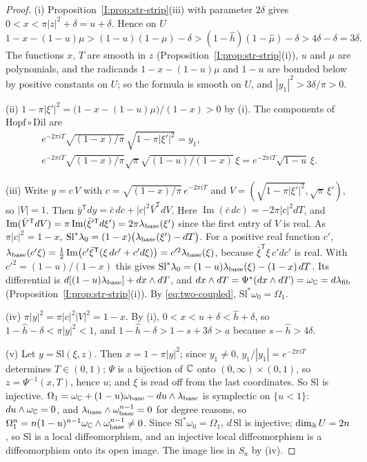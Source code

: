 \begin{proof}
(i) Proposition~\ref{I:prop:str-strip}(iii) with parameter $2\delta$ gives $0<x<\pi|z|^2+\delta=u+\delta$. Hence on $U$
\[
 1-x-(1-u)\mu>(1-u)(1-\mu)-\delta>(1-\hat h)(1-\hat\mu)-\delta>4\delta-\delta=3\delta .
\]
The functions $x$, $T$ are smooth in $z$ (Proposition~\ref{I:prop:str-strip}(i)), $u$ and $\mu$ are polynomials, and the
radicands $1-x-(1-u)\mu$ and $1-u$ are bounded below by positive constants on $U$; so the formula is smooth on $U$,
and $|y_1|^2>3\delta/\pi>0$.

(ii) $1-\pi|\xi'|^2=\bigl(1-x-(1-u)\mu\bigr)/(1-x)>0$ by (i). The components of $\mathrm{Hopf}\circ\mathrm{Dil}$ are
\begin{gather*}
 e^{-2\pi iT}\sqrt{(1-x)/\pi}\,\sqrt{1-\pi|\xi'|^2}=y_1,\\
 e^{-2\pi iT}\sqrt{(1-x)/\pi}\sqrt\pi\sqrt{(1-u)/(1-x)}\,\xi=e^{-2\pi iT}\sqrt{1-u}\,\xi.
\end{gather*}

(iii) Write $y=c\,V$ with $c=\sqrt{(1-x)/\pi}\,e^{-2\pi iT}$ and $V=(\sqrt{1-\pi|\xi'|^2},\sqrt\pi\,\xi')$, so $|V|=1$. Then
$\bar y^{\mathsf T}dy=\bar c\,dc+|c|^2\bar V^{\mathsf T}dV$. Here $\operatorname{Im}(\bar c\,dc)=-2\pi|c|^2dT$, and
$\operatorname{Im}(\bar V^{\mathsf T}dV)=\pi\operatorname{Im}(\bar\xi'^{\mathsf T}d\xi')=2\pi\lambda_{\rm base}(\xi')$ since the first entry of $V$ is
real. As $\pi|c|^2=1-x$, $\mathrm{Sl}^*\lambda_0=(1-x)\bigl(\lambda_{\rm base}(\xi')-dT\bigr)$. For a positive real function $c'$, $\lambda_{\rm base}(c'\xi)=\frac12\operatorname{Im}\bigl(c'\bar\xi^{\mathsf T}(\xi\,dc'+c'd\xi)\bigr)=c'^2\lambda_{\rm base}(\xi)$,
because $\bar\xi^{\mathsf T}\xi\,c'dc'$ is real. With $c'^2=(1-u)/(1-x)$ this gives
$\mathrm{Sl}^*\lambda_0=(1-u)\lambda_{\rm base}(\xi)-(1-x)\,dT$. Its differential is $d[(1-u)\lambda_{\rm base}]+dx\wedge dT$, and
$dx\wedge dT=\Psi^*(dx\wedge dT)=\omega_{\mathbb{C}}=d\lambda_{\rm fib}$ (Proposition~\ref{I:prop:str-strip}(i)). By \eqref{eq:two-coupled},
$\mathrm{Sl}^*\omega_0=\Omega_1$.

(iv) $\pi|y|^2=\pi|c|^2|V|^2=1-x$. By (i), $0<x<u+\delta<\hat h+\delta$, so $1-\hat h-\delta<\pi|y|^2<1$, and
$1-\hat h-\delta>1-s+3\delta>a$ because $s-\hat h>4\delta$.

(v) Let $y=\mathrm{Sl}(\xi,z)$. Then $x=1-\pi|y|^2$; since $y_1\ne0$, $y_1/|y_1|=e^{-2\pi iT}$ determines $T\in(0,1)$;
$\Psi$ is a bijection of $\mathbb{C}$ onto $(0,\infty)\times(0,1)$, so $z=\Psi^{-1}(x,T)$, hence $u$; and $\xi$ is read off from the last
coordinates. So $\mathrm{Sl}$ is injective. $\Omega_1=\omega_{\mathbb{C}}+(1-u)\omega_{\rm base}-du\wedge\lambda_{\rm base}$ is symplectic on
$\{u<1\}$: $du\wedge\omega_{\mathbb{C}}=0$, and $\lambda_{\rm base}\wedge\omega_{\rm base}^{n-1}=0$ for degree reasons, so
$\Omega_1^n=n(1-u)^{n-1}\omega_{\mathbb{C}}\wedge\omega_{\rm base}^{n-1}\ne0$. Since $\mathrm{Sl}^*\omega_0=\Omega_1$, $d\,\mathrm{Sl}$ is injective; $\dim_{\mathbb{R}} U=2n$, so $\mathrm{Sl}$ is a local diffeomorphism, and an
injective local diffeomorphism is a diffeomorphism onto its open image. The image lies in $S_a$ by (iv).


\end{proof}

